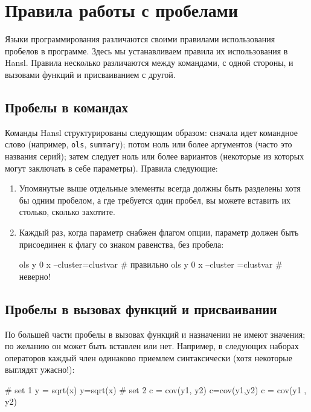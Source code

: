 \chapter{Правила работы с пробелами}

Языки программирования различаются своими правилами использования
пробелов в программе. Здесь мы устанавливаем правила их использования
в Hansl. Правила несколько различаются между командами, с одной
стороны, и вызовами функций и присваиванием с другой.

\section{Пробелы в командах}
Команды Hansl структурированы следующим образом: сначала идет
командное слово (например, \texttt{ols}, \texttt{summary}); потом ноль
или более аргументов (часто это названия серий); затем следует ноль
или более вариантов (некоторые из которых могут заключать в себе
параметры). Правила следующие:

\begin{enumerate}
\item Упомянутые выше отдельные элементы всегда должны быть разделены
  хотя бы одним пробелом, а где требуется один пробел, вы можете
  вставить их столько, сколько захотите.
\item Каждый раз, когда параметр снабжен флагом опции, параметр должен
  быть присоединен к флагу со знаком равенства, без пробела:
\begin{code}
ols y 0 x --cluster=clustvar  # правильно
ols y 0 x --cluster =clustvar # неверно!
\end{code}
\end{enumerate}

\section{Пробелы в вызовах функций и присваивании}

По большей части пробелы в вызовах функций и назначении не имеют
значения; по желанию он может быть вставлен или нет. Например, в
следующих наборах операторов каждый член одинаково приемлем
синтаксически (хотя некоторые выглядят ужасно!):
\begin{code}
# set 1
y = sqrt(x)
y=sqrt(x)
# set 2
c = cov(y1, y2)
c=cov(y1,y2)
c  = cov(y1 , y2)
\end{code}

